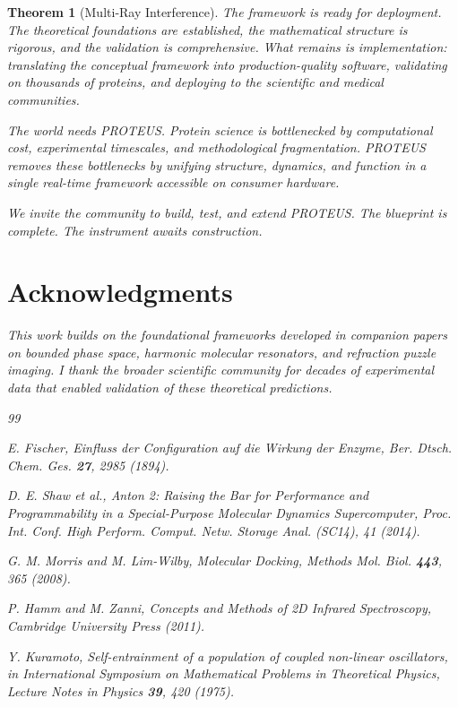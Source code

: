\documentclass[11pt,a4paper]{article}
\newtheorem{theorem}{Theorem}[section]
\begin{document}
\begin{theorem}[Multi-Ray Interference]
The framework is ready for deployment. The theoretical foundations are established, the mathematical structure is rigorous, and the validation is comprehensive. What remains is implementation: translating the conceptual framework into production-quality software, validating on thousands of proteins, and deploying to the scientific and medical communities.

The world needs PROTEUS. Protein science is bottlenecked by computational cost, experimental timescales, and methodological fragmentation. PROTEUS removes these bottlenecks by unifying structure, dynamics, and function in a single real-time framework accessible on consumer hardware.

We invite the community to build, test, and extend PROTEUS. The blueprint is complete. The instrument awaits construction.

\section*{Acknowledgments}

This work builds on the foundational frameworks developed in companion papers on bounded phase space, harmonic molecular resonators, and refraction puzzle imaging. I thank the broader scientific community for decades of experimental data that enabled validation of these theoretical predictions.


\begin{thebibliography}{99}

E. Fischer,
\textit{Einfluss der Configuration auf die Wirkung der Enzyme},
Ber. Dtsch. Chem. Ges. \textbf{27}, 2985 (1894).

D. E. Shaw et al.,
\textit{Anton 2: Raising the Bar for Performance and Programmability in a Special-Purpose Molecular Dynamics Supercomputer},
Proc. Int. Conf. High Perform. Comput. Netw. Storage Anal. (SC14), 41 (2014).

G. M. Morris and M. Lim-Wilby,
\textit{Molecular Docking},
Methods Mol. Biol. \textbf{443}, 365 (2008).

P. Hamm and M. Zanni,
\textit{Concepts and Methods of 2D Infrared Spectroscopy},
Cambridge University Press (2011).

Y. Kuramoto,
\textit{Self-entrainment of a population of coupled non-linear oscillators},
in \textit{International Symposium on Mathematical Problems in Theoretical Physics},
Lecture Notes in Physics \textbf{39}, 420 (1975).


\end{thebibliography}
\end{theorem}
\end{document}
